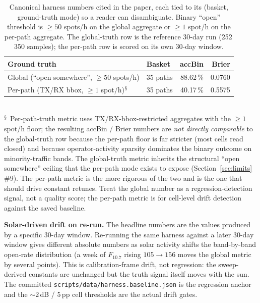\documentclass[11pt,a4paper]{article}
\begin{document}
\begin{table}[H]
\centering
\caption{Canonical harness numbers cited in the paper, each tied to
its (basket, ground-truth mode) so a reader can
disambiguate.  Binary ``open'' threshold is $\geq 50$ spots/h on
the global aggregate or $\geq 1$ spot/h on the per-path aggregate.
The global-truth row is the reference 30-day run (252\,350
samples); the per-path row is scored on its own 30-day window.}
\label{tab:harnessruns}
\begin{tabular}{@{}llrr@{}}
\toprule
\textbf{Ground truth} & \textbf{Basket} &
\textbf{accBin} & \textbf{Brier} \\
\midrule
Global (``open somewhere'', $\geq 50$ spots/h) & 35 paths & 88.62\,\% & 0.0760 \\
Per-path (TX/RX bbox, $\geq 1$ spot/h)${}^{\mathsection}$ & 35 paths & 40.17\,\% & 0.5575 \\
\bottomrule
\end{tabular}\\[2pt]
\footnotesize
${}^{\mathsection}$ Per-path-truth metric uses TX/RX-bbox-restricted aggregates with the
$\geq 1$ spot/h floor; the resulting accBin / Brier numbers are
\emph{not directly comparable} to the global-truth row because
the per-path floor is far stricter (most cells read closed) and
because operator-activity sparsity dominates the binary outcome
on minority-traffic bands.  The global-truth metric
inherits the structural ``open somewhere'' ceiling that the
per-path mode exists to expose
(Section~\ref{sec:limits} \#9).  The per-path metric is the more
rigorous of the two and
is the one that should drive constant retunes.  Treat the global
number as a
regression-detection signal, not a quality score; the per-path
metric is for cell-level drift detection against the saved
baseline.

\smallskip
\textbf{Solar-driven drift on re-run.}  The headline numbers are
the values produced by a specific 30-day window.
Re-running the same harness
against a later 30-day window gives different absolute
numbers as solar activity shifts the band-by-band open-rate
distribution (a week of $F_{10.7}$ rising
$105 \to 156$ moves the global metric by several points).
This is calibration-frame drift, not regression: the
sweep-derived constants are unchanged but the truth signal
itself moves with the sun.  The committed
\texttt{scripts/data/harness.baseline.json} is the regression
anchor and the ${\sim}\!2$\,dB / $5$\,pp cell thresholds are the
actual drift gates.
\end{table}
\end{document}
